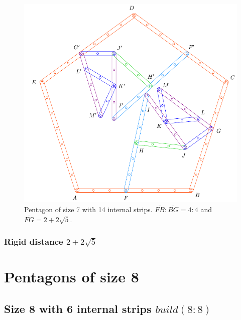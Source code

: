 \documentclass[11pt]{article}
\begin{document}
\begin{figure}[H]
\centering
\includegraphics[scale=0.8]{7/penta7-14a}
\caption{Pentagon of size 7 with 14 internal strips. $\overline{FB} : \overline{BG} = 4:4$ and $\overline{FG} = 2 + 2\sqrt5$.}
\label{fig:penta7-14a}
\end{figure}
%
\subsubsection{Rigid distance $2 + 2\sqrt5$}



\section{Pentagons of size 8}

\subsection{Size 8 with 6 internal strips $build(8:8)$}
\end{document}
